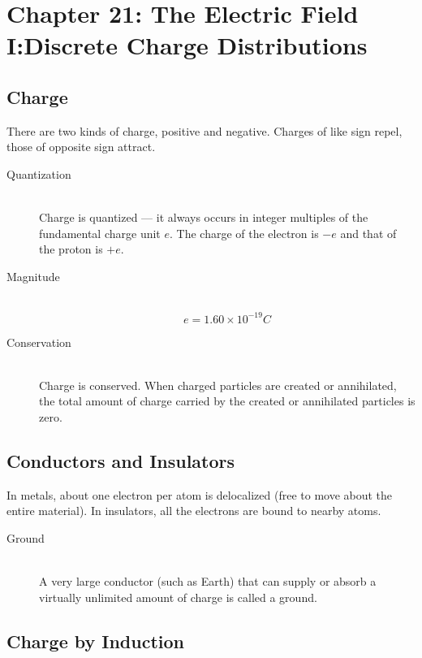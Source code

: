\documentclass[../main.tex]{subfiles}
\begin{document}
\section{Chapter 21: The Electric Field I:\@ Discrete Charge Distributions}\label{chapter-21}

\subsection{Charge}\label{charge}

There are two kinds of charge, positive and negative. Charges of like
sign repel, those of opposite sign attract.
\begin{description}
  \item[Quantization] \hfill \\ Charge is quantized --- it always occurs in integer
    multiples of the fundamental charge unit \(e\). The charge of the electron is
    \(-e\) and that of the proton is \(+e\).
  \item[Magnitude] \hfill \\
    \begin{equation}
      e=1.60\times10^{-19}C
    \end{equation}
  \item[Conservation] \hfill \\ Charge is conserved. When charged particles are created
    or annihilated, the total amount of charge carried by the created or
    annihilated particles is zero.
\end{description}

\subsection{Conductors and Insulators}\label{conductors-and-insulators}

In metals, about one electron per atom is delocalized (free to move
about the entire material). In insulators, all the electrons are bound
to nearby atoms.
\begin{description}
  \item[Ground] \hfill \\ A very large conductor (such as Earth) that can
    supply or absorb a virtually unlimited amount of charge is called a ground.
\end{description}

\subsection{Charge by Induction}\label{charge-by-induction}
\end{document}
